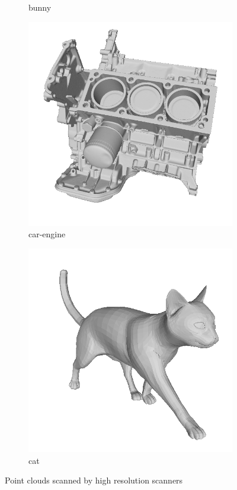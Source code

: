 \documentclass[border=15pt, multi, tikz]{article}
\begin{document}
\begin{figure}[!h]
\begin{subfigure}[b]{0.23\linewidth}
		\caption{bunny}
	\end{subfigure}
	\begin{subfigure}[b]{0.23\linewidth}
		\includegraphics[width=\linewidth]{./Figures/train-dataset/06.car-engine.png}
		\caption{car-engine}
	\end{subfigure}
	\begin{subfigure}[b]{0.23\linewidth}
		\includegraphics[width=\linewidth]{./Figures/train-dataset/07.cat.png}
		\caption{cat}
	\end{subfigure}
	
	\label{fig:dataset-demo}
	\caption{Point clouds scanned by high resolution scanners}
\end{figure}
\end{document}
